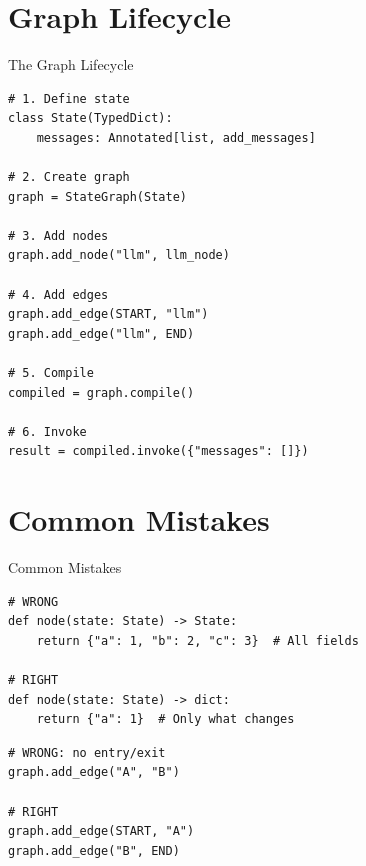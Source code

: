 \documentclass[aspectratio=169,11pt]{beamer}
\begin{document}
\section{Graph Lifecycle}
\begin{frame}[fragile,t,shrink=5]{The Graph Lifecycle}
\vspace{0.05cm}

\begin{codebox}
\begin{lstlisting}
# 1. Define state
class State(TypedDict):
    messages: Annotated[list, add_messages]

# 2. Create graph
graph = StateGraph(State)

# 3. Add nodes
graph.add_node("llm", llm_node)

# 4. Add edges
graph.add_edge(START, "llm")
graph.add_edge("llm", END)

# 5. Compile
compiled = graph.compile()

# 6. Invoke
result = compiled.invoke({"messages": []})
\end{lstlisting}
\end{codebox}
\end{frame}

\section{Common Mistakes}
\begin{frame}[fragile,t,shrink=2]{Common Mistakes}
\vspace{0.05cm}

\begin{warningbox}
\begin{lstlisting}
# WRONG
def node(state: State) -> State:
    return {"a": 1, "b": 2, "c": 3}  # All fields

# RIGHT
def node(state: State) -> dict:
    return {"a": 1}  # Only what changes
\end{lstlisting}
\end{warningbox}

\vspace{0.1cm}

\begin{warningbox}
\begin{lstlisting}
# WRONG: no entry/exit
graph.add_edge("A", "B")

# RIGHT
graph.add_edge(START, "A")
graph.add_edge("B", END)
\end{lstlisting}
\end{warningbox}
\end{frame}
\end{document}
